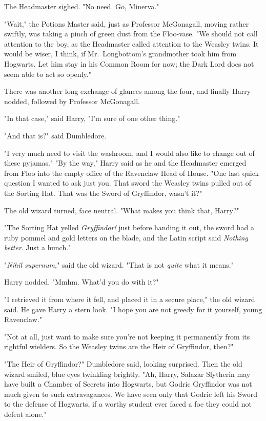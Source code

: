 The Headmaster sighed. "No need. Go, Minerva."

"Wait," the Potions Master said, just as Professor McGonagall, moving rather 
swiftly, was taking a pinch of green dust from the Floo-vase. "We should not 
call attention to the boy, as the Headmaster called attention to the Weasley 
twins. It would be wiser, I think, if Mr.~Longbottom's grandmother took him 
from Hogwarts. Let him stay in his Common Room for now; the Dark Lord does not 
seem able to act so openly."

There was another long exchange of glances among the four, and finally Harry 
nodded, followed by Professor McGonagall.

"In that case," said Harry, "I'm sure of one other thing."

"And that is?" said Dumbledore.

"I very much need to visit the washroom, and I would also like to change out of 
these pyjamas."
\sbreak
"By the way," Harry said as he and the Headmaster emerged from Floo into the 
empty office of the Ravenclaw Head of House. "One last quick question I wanted 
to ask just you. That sword the Weasley twins pulled out of the Sorting Hat. 
That was the Sword of Gryffindor, wasn't it?"

The old wizard turned, face neutral. "What makes you think that, Harry?"

"The Sorting Hat yelled \emph{Gryffindor!} just before handing it out, the 
sword had a ruby pommel and gold letters on the blade, and the Latin script 
said \emph{Nothing better}. Just a hunch."

"\emph{Nihil supernum,}" said the old wizard. "That is not \emph{quite} what it 
means."

Harry nodded. "Mmhm. What'd you do with it?"

"I retrieved it from where it fell, and placed it in a secure place," the old 
wizard said. He gave Harry a stern look. "I hope you are not greedy for it 
yourself, young Ravenclaw."

"Not at all, just want to make sure you're not keeping it permanently from its 
rightful wielders. So the Weasley twins are the Heir of Gryffindor, then?"

"The Heir of Gryffindor?" Dumbledore said, looking surprised. Then the old 
wizard smiled, blue eyes twinkling brightly. "Ah, Harry, Salazar Slytherin may 
have built a Chamber of Secrets into Hogwarts, but Godric Gryffindor was not 
much given to such extravagances. We have seen only that Godric left his Sword 
to the defense of Hogwarts, if a worthy student ever faced a foe they could not 
defeat alone."


